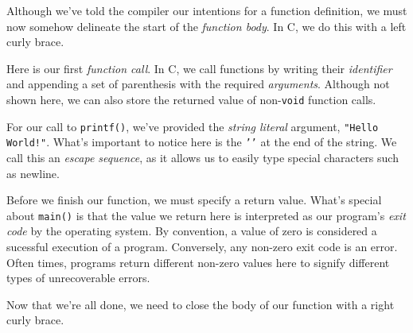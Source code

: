 
\noindent
Although we've told the compiler our intentions for a function
definition, we must now somehow delineate the start of the
\emph{function body}.  In C, we do this with a left curly brace.


\noindent
Here is our first \emph{function call}.  In C, we call functions by
writing their \emph{identifier} and appending a set of parenthesis with
the required \emph{arguments}.  Although not shown here, we can also
store the returned value of non-\texttt{void} function calls.

For our call to \texttt{printf()}, we've provided the \emph{%
string literal} argument, \texttt{"Hello World!\n"}.  What's
important to notice here is the \texttt{'\n'} at the end of the
string. We call this an \emph{escape sequence}, as it allows us to
easily type special characters such as newline.


\noindent
Before we finish our function, we must specify a return value.  What's
special about \texttt{main()} is that the value we return here is
interpreted as our program's \emph{exit code} by the operating system.
By convention, a value of zero is considered a sucessful execution of a
program.  Conversely, any non-zero exit code is an error.  Often times,
programs return different non-zero values here to signify different
types of unrecoverable errors.


\noindent
Now that we're all done, we need to close the body of our function with
a right curly brace.
